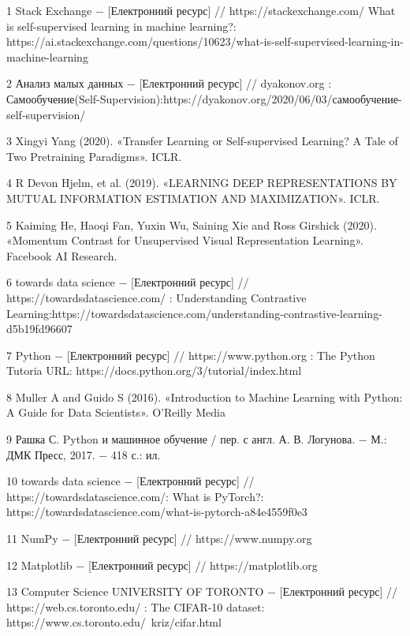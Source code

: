 
\hspace*{26pt} 
1 Stack Exchange $-$ [Електронний ресурс] // https://stackexchange.com/ What is self-supervised learning in machine learning?: https://ai.stackexchange.com/questions/10623/what-is-self-supervised-learning-in-machine-learning

2 Анализ малых данных $-$ [Електронний ресурс] // dyakonov.org : Самообучение\hfill (Self-Supervision):\hfill https://dyakonov.org/2020/06/03/\newline самообучение-self-supervision/

3 Xingyi Yang (2020). «Transfer Learning or Self-supervised Learning? A Tale of Two Pretraining Paradigms». ICLR.

4 R Devon Hjelm, et al. (2019). «LEARNING DEEP REPRESENTATIONS BY MUTUAL INFORMATION ESTIMATION AND MAXIMIZATION». ICLR.

5 Kaiming He, Haoqi Fan, Yuxin Wu, Saining Xie and Ross Girshick (2020). «Momentum Contrast for Unsupervised Visual Representation Learning». Facebook AI Research.

6 towards data science $-$ [Електронний ресурс] // https://towardsdatascience.com/ : Understanding Contrastive Learning:\newline https://towardsdatascience.com/understanding-contrastive-learning-d5b19fd96607

7 Python $-$ [Електронний ресурс] // https://www.python.org :  The Python Tutoria URL: https://docs.python.org/3/tutorial/index.html

8 Muller A and Guido S (2016). «Introduction to Machine Learning with Python: A Guide for Data Scientists». O'Reilly Media

9 Рашка С. Python и машинное обучение / пер. с англ. А. В. Логунова. $-$ М.: ДМК Пресс, 2017. $-$ 418 с.: ил.

10 towards data science $-$ [Електронний ресурс]  // https://towardsdatascience.com/\newline : What is PyTorch?: https://towardsdatascience.com/what-is-pytorch-a84e4559f0e3

11 NumPy $-$ [Електронний ресурс] // https://www.numpy.org

12 Matplotlib $-$ [Електронний ресурс] // https://matplotlib.org

13 Computer Science UNIVERSITY OF TORONTO $-$ [Електронний ресурс] // https://web.cs.toronto.edu/ : The CIFAR-10 dataset: https://www.cs.toronto.edu/~kriz/cifar.html 

